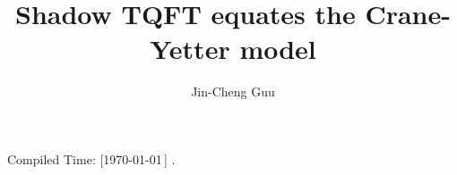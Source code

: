 \title{Shadow TQFT equates the Crane-Yetter model}
\author{Jin-Cheng Guu}
\date{}



\maketitle
\begin{flushright}
  Compiled Time: [\today\,\DTMcurrenttime] \qquad.
\end{flushright}


\tableofcontents
